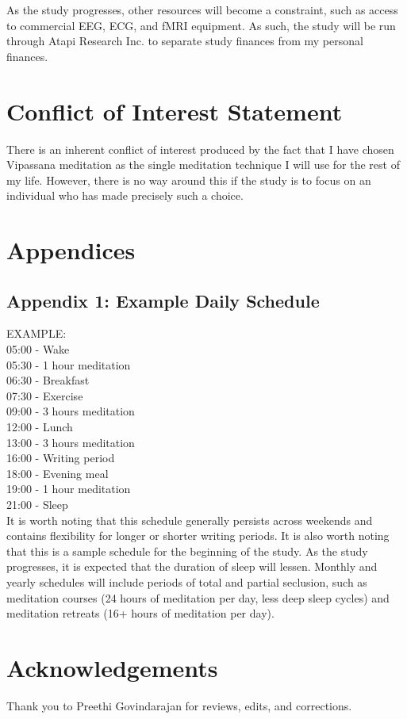 \documentclass[a4paper, amsfonts, amssymb, amsmath, reprint, showkeys, nofootinbib, twoside]{revtex4-1}
\begin{document}
As the study progresses, other resources will become a constraint, such as
access to commercial EEG, ECG, and fMRI equipment.
As such, the study will be run through Atapi Research Inc. to separate
study finances from my personal finances.

\section{Conflict of Interest Statement}

There is an inherent conflict of interest produced by the fact that I have
chosen Vipassana meditation as the single meditation technique I will use
for the rest of my life.
However, there is no way around this if the study is to focus on an
individual who has made precisely such a choice.

\section{Appendices}

\subsection{Appendix 1: Example Daily Schedule}

EXAMPLE: \\
05:00 - Wake \\
05:30 - 1 hour meditation \\
06:30 - Breakfast \\
07:30 - Exercise \\
09:00 - 3 hours meditation \\
12:00 - Lunch \\
13:00 - 3 hours meditation \\
16:00 - Writing period \\
18:00 - Evening meal \\
19:00 - 1 hour meditation \\
21:00 - Sleep \\

It is worth noting that this schedule generally persists across weekends and contains
flexibility for longer or shorter writing periods.
It is also worth noting that this is a sample schedule for the beginning of the study.
As the study progresses, it is expected that the duration of sleep will lessen.
Monthly and yearly schedules will include periods of total and partial seclusion,
such as meditation courses (24 hours of meditation per day, less deep sleep cycles)
and meditation retreats (16+ hours of meditation per day).

\section*{Acknowledgements}

Thank you to Preethi Govindarajan for reviews, edits, and corrections.

\newpage


{}


% 
\end{document}
